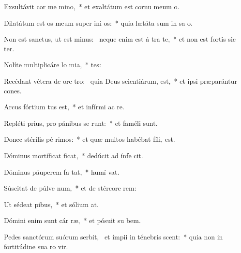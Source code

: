 \item Exsultávit cor me  mino,~* et exaltátum est cornu meum   o.
\item Dilatátum est os meum super ini os:~* quia lætáta sum in sa o.
\item Non est sanctus, ut est minus:~\pscross{} neque enim est á tra te,~* et non est fortis sic  ter.
\item Nolíte multiplicáre lo mia,~* tes:
\item Recédant vétera de ore tro:~\pscross{} quia Deus scientiárum,  est,~* et ipsi præparántur cones.
\item Arcus fórtium tus est,~* et infírmi ac  re.
\item Repléti prius, pro pánibus se runt:~* et faméli  sunt.
\item Donec stérilis pé rimos:~* et quæ multos habébat fíli,  est.
\item Dóminus mortíficat  ficat,~* dedúcit ad ínfe  cit.
\item Dóminus páuperem fa  tat,~* humí  vat.
\item Súscitat de púlve num,~* et de stércore  rem:
\item Ut sédeat  pibus,~* et sólium  at.
\item Dómini enim sunt cár ræ,~* et pósuit su  bem.
\item Pedes sanctórum suórum serbit,~\pscross{} et ímpii in ténebris scent:~* quia non in fortitúdine sua ro vir.
